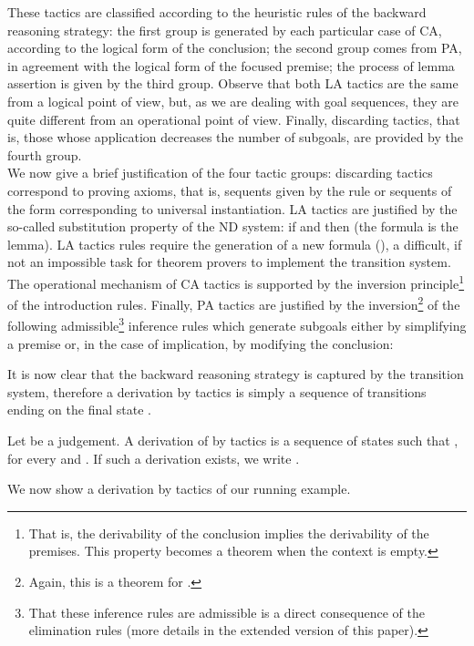 \documentclass[a4paper,UKenglish]{lipics}
\begin{document}
These tactics are classified according to the heuristic rules of the backward reasoning strategy: the first group is generated by each particular case of CA, according to the logical form of the conclusion; the second group comes from PA, in agreement with the logical form of the focused premise; the process of lemma assertion is given by the third group.  Observe that both LA tactics are the same from a logical point of view, but, as we are dealing with goal sequences, they are quite different from an operational point of view. Finally, discarding tactics, that is, those whose application decreases the number of subgoals, are provided by the fourth group. \\ 
We now give a brief justification of the four tactic groups: discarding tactics correspond to proving axioms, that is, sequents given by the  rule or sequents of the form   corresponding to universal instantiation.
LA tactics are justified by the so-called substitution property of the ND system: if  and  then   (the formula  is the lemma). LA tactics rules require the generation of a new formula (), a difficult, if not an impossible task
for theorem provers to implement the transition system.
The operational mechanism of CA tactics is supported by the inversion principle\footnote{That is, the derivability of the conclusion implies 
the derivability of the premises. This property becomes a theorem when the context  is empty.} of the introduction rules. Finally, PA tactics are justified by the inversion\footnote{Again, this is a theorem for .} of the following admissible\footnote{That these inference rules are admissible is a direct consequence of the elimination rules (more details in the extended version of this paper).} inference rules which generate subgoals either by simplifying a premise or, in the case of implication, by modifying the conclusion: 




\smallskip
It is now clear that the backward reasoning strategy is captured by the transition system, therefore a derivation by tactics is simply a sequence of transitions ending on the final state . 

\begin{definition}\label{def:dertac}
 Let  be a judgement. A derivation of  by tactics is a sequence of states  such that , for every  and . If such a derivation exists, we write . 
\end{definition}

We now show a derivation by tactics of our running example.
\end{document}
